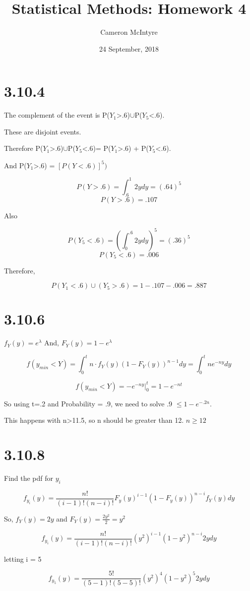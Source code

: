 \documentclass[svgnames]{article}
\title{Statistical Methods: Homework 4}
\author{Cameron McIntyre}
\date{24 September, 2018}
\begin{document}
\maketitle

\section{3.10.4}
The complement of the event is P($Y_1$>.6)$\cup$P($Y_5$<.6).

These are disjoint events.

Therefore  P($Y_1$>.6)$\cup$P($Y_5$<.6)= P($Y_1$>.6) + P($Y_5$<.6).

And  P($Y_1$>.6) = $[P(Y<.6)]^5)$

$$ P(Y>.6)= \int_{.6}^{1}2y dy=(.64)^5  $$ $$   P(Y>.6) = .107$$

Also

$$ P(Y_5<.6) = (\int_{0}^{.6}2y dy)^5 = (.36)^5 $$ $$  P(Y_5<.6)  = .006$$

Therefore,

$$  P(Y_1<.6)\cup(Y_5>.6) = 1 - .107 - .006 = .887 $$

\section{3.10.6}

$f_Y(y)=e^{\lambda}$ And, $F_Y(y)=1-e^{\lambda}$


$$f(y_{min}<Y)=\int_{0}^{t} n \cdot f_Y(y)(1-F_Y(y))^{n-1}dy = \int_{0}^{t}ne^{-ny}dy$$

$$ f(y_{min}<Y)=-e^{-ny}\Big|^{t}_{0}=1-e^{-nt}$$

So using t=.2 and Probability = .9, we need to solve .9 $\leq 1- e^{-.2n}$.


This happens with n>11.5, so n should be greater than 12. $n\geq 12$

\section{3.10.8}

Find the pdf for $y_i$

$$f_{y_{i}}(y)=\frac{n!}{(i-1)!(n-i)!}F_y(y)^{i-1}(1-F_y(y))^{n-i}f_Y(y)dy $$

So, $f_Y(y) = 2y$ and $F_{Y}(y)=\frac{2y^2}{2}=y^2$

$$f_{y_{i}}(y)=\frac{n!}{(i-1)!(n-i)!}(y^2)^{i-1}(1-y^2)^{n-i} 2y dy$$

letting i = 5

$$f_{y_{5}}(y)=\frac{5!}{(5-1)!(5-5)!}(y^2)^{4}(1-y^2)^{5} 2y dy$$
\end{document}
